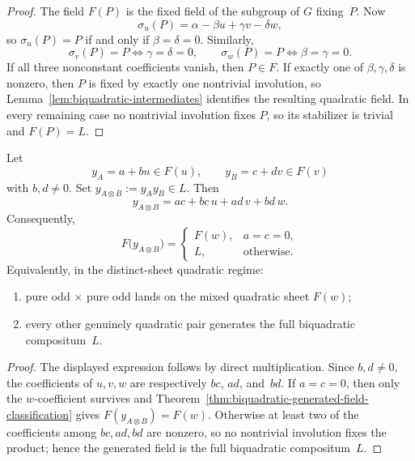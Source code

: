 \begin{proof}
The field $F(P)$ is the fixed field of the subgroup of $G$ fixing~$P$.
Now
\[
\sigma_u(P)=\alpha-\beta u+\gamma v-\delta w,
\]
so $\sigma_u(P)=P$ if and only if $\beta=\delta=0$.
Similarly,
\[
\sigma_v(P)=P \iff \gamma=\delta=0,
\qquad
\sigma_w(P)=P \iff \beta=\gamma=0.
\]
If all three nonconstant coefficients vanish, then $P\in F$.  If exactly one of
$\beta,\gamma,\delta$ is nonzero, then $P$ is fixed by exactly one nontrivial
involution, so Lemma~\ref{lem:biquadratic-intermediates} identifies the
resulting quadratic field.  In every remaining case no nontrivial involution
fixes $P$, so its stabilizer is trivial and $F(P)=L$.
\end{proof}

\begin{theorem}
\label{thm:exact-quadratic-tensor-dichotomy}
Let
\[
y_A=a+bu\in F(u),\qquad y_B=c+dv\in F(v)
\]
with $b,d\neq 0$.
Set $y_{A\otimes B}:=y_Ay_B\in L$.
Then
\[
y_{A\otimes B}=ac+bc\,u+ad\,v+bd\,w.
\]
Consequently,
\[
F\bigl(y_{A\otimes B}\bigr)=
\begin{cases}
F(w),& a=c=0,\\[4pt]
L,& \text{otherwise.}
\end{cases}
\]
Equivalently, in the distinct-sheet quadratic regime:
\begin{enumerate}[label=\textup{(\roman*)}]
\item pure odd $\times$ pure odd lands on the mixed quadratic sheet $F(w)$;
\item every other genuinely quadratic pair generates the full biquadratic
compositum~$L$.
\end{enumerate}
\end{theorem}

\begin{proof}
The displayed expression follows by direct multiplication.  Since $b,d\neq 0$,
the coefficients of $u,v,w$ are respectively $bc$, $ad$, and~$bd$.  If
$a=c=0$, then only the $w$-coefficient survives and
Theorem~\ref{thm:biquadratic-generated-field-classification} gives
$F(y_{A\otimes B})=F(w)$.  Otherwise at least two of the coefficients among
$bc,ad,bd$ are nonzero, so no nontrivial involution fixes the product; hence the
generated field is the full biquadratic compositum~$L$.
\end{proof}

